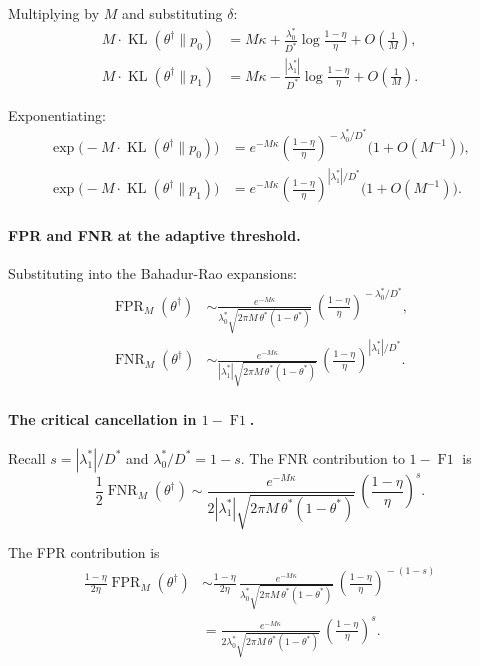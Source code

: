 Multiplying by $M$ and substituting $\delta$:
\[
\begin{aligned}
M\cdot\operatorname{KL}(\theta^\dagger\|p_0)
&= M\kappa + \frac{\lambda_0^*}{D^*}\log\frac{1-\eta}{\eta} + O\!\left(\frac1M\right),\\[4pt]
M\cdot\operatorname{KL}(\theta^\dagger\|p_1)
&= M\kappa - \frac{|\lambda_1^*|}{D^*}\log\frac{1-\eta}{\eta} + O\!\left(\frac1M\right).
\end{aligned}
\]

Exponentiating:
\[
\begin{aligned}
\exp\!\bigl(-M\cdot\operatorname{KL}(\theta^\dagger\|p_0)\bigr)
&= e^{-M\kappa}
   \left(\frac{1-\eta}{\eta}\right)^{\!-\lambda_0^*/D^*}
   \bigl(1+O(M^{-1})\bigr),\\[4pt]
\exp\!\bigl(-M\cdot\operatorname{KL}(\theta^\dagger\|p_1)\bigr)
&= e^{-M\kappa}
   \left(\frac{1-\eta}{\eta}\right)^{\!|\lambda_1^*|/D^*}
   \bigl(1+O(M^{-1})\bigr).
\end{aligned}
\]

\paragraph{FPR and FNR at the adaptive threshold.}

Substituting into the Bahadur-Rao expansions:
\[
\begin{aligned}
\operatorname{FPR}_M(\theta^\dagger)
&\sim \frac{e^{-M\kappa}}
          {\lambda_0^*\sqrt{2\pi M\,\theta^*(1-\theta^*)}}\,
        \left(\frac{1-\eta}{\eta}\right)^{\!-\lambda_0^*/D^*},\\[4pt]
\operatorname{FNR}_M(\theta^\dagger)
&\sim \frac{e^{-M\kappa}}
          {|\lambda_1^*|\sqrt{2\pi M\,\theta^*(1-\theta^*)}}\,
        \left(\frac{1-\eta}{\eta}\right)^{\!|\lambda_1^*|/D^*}.
\end{aligned}
\]

\paragraph{The critical cancellation in $1-\operatorname{F1}$.}

Recall $s=|\lambda_1^*|/D^*$ and $\lambda_0^*/D^*=1-s$.  The FNR contribution to
$1-\operatorname{F1}$ is
\[
\frac12\operatorname{FNR}_M(\theta^\dagger)
\sim \frac{e^{-M\kappa}}
          {2|\lambda_1^*|\sqrt{2\pi M\,\theta^*(1-\theta^*)}}\,
      \left(\frac{1-\eta}{\eta}\right)^{\!s}.
\]

The FPR contribution is
\[
\begin{aligned}
\frac{1-\eta}{2\eta}\operatorname{FPR}_M(\theta^\dagger)
&\sim \frac{1-\eta}{2\eta}\,
      \frac{e^{-M\kappa}}
           {\lambda_0^*\sqrt{2\pi M\,\theta^*(1-\theta^*)}}\,
      \left(\frac{1-\eta}{\eta}\right)^{\!-(1-s)}\\[4pt]
&= \frac{e^{-M\kappa}}
        {2\lambda_0^*\sqrt{2\pi M\,\theta^*(1-\theta^*)}}\,
      \left(\frac{1-\eta}{\eta}\right)^{\!s}.
\end{aligned}
\]

